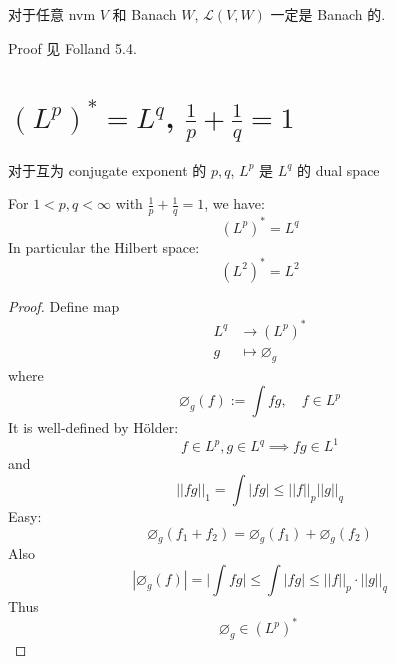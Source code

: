 \documentclass[lang=cn,11pt]{elegantbook}
\begin{document}
\begin{theorem}
对于任意 nvm $V$ 和 Banach $W$, \( \mathcal{L}(V,W)\) 一定是 Banach 的.
\end{theorem}
Proof 见 Folland 5.4.


\section{$(L^p)^* = L^q$, $\frac{1}{p} + \frac{1}{q} = 1$ }

\begin{theorem}{对于互为 conjugate exponent 的 $p,q$, $L^p$ 是 $L^q$ 的 dual space}
    
\end{theorem}

For $1 < p,q < \infty$ with $\frac{1}{p} + \frac{1}{q} = 1$, we have: \[
(L^p)^* = L^q
\]
In particular the Hilbert space: \[
(L^2)^*  = L^2
\]

\begin{proof}
    Define map \begin{align}
        L^q &\to (L^p)^* \\
        g &\mapsto \varnothing_g
    \end{align}
    where $$\varnothing_g(f) := \int fg,\quad f \in L^p $$
    It is well-defined by Hölder: \[
    f\in L^p, g\in L^q \implies fg \in L^1 
    \]
    and \[
    ||fg||_1 = \int |fg| \leq  ||f||_p ||g||_q
    \]
    Easy: \[
    \varnothing_g (f_1 + f_2) = \varnothing_g (f_1) + \varnothing_g(f_2)
    \]
    Also \[
    |\varnothing_g(f)| =\bigg|\int fg\bigg| \leq \int |fg| \leq ||f||_p\cdot  ||g||_q
    \]
    Thus \[
    \varnothing_g \in (L^p)^*\
    \]
\end{proof}
\end{document}
